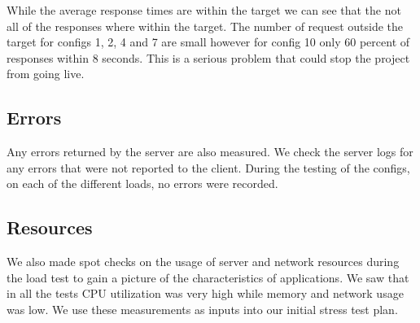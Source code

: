 While the average response times are within the target we can see that the not all of the responses where within the target. The number of request outside the target for configs 1, 2, 4 and 7 are small however for config 10 only 60 percent of responses within 8 seconds. This is a serious problem that could stop the project from going live.


\subsection*{Errors}
Any errors returned by the server are also measured. We check the server logs for any errors that were not reported to the client. 
During the testing of the configs, on each of the different loads, no errors were recorded.



\subsection*{Resources}
We also made spot checks on the usage of server and network resources during the load test to gain a picture of the characteristics of applications. We saw that in all the tests CPU utilization was very high while memory and network usage was low. We use these measurements as inputs into our initial stress test plan. 





